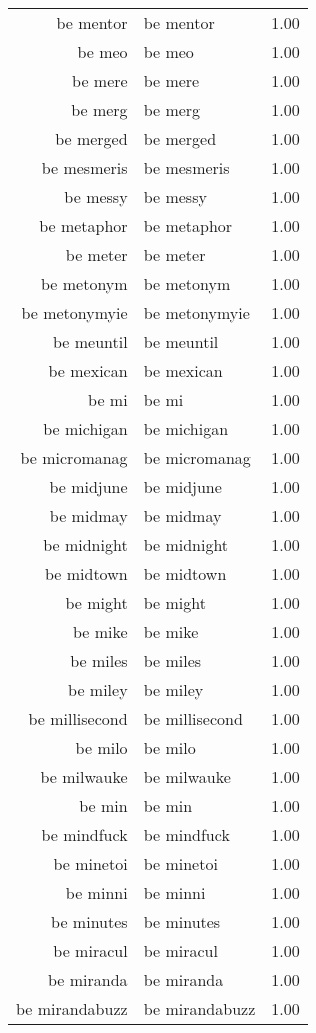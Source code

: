 \begin{table}[ht]
\begin{tabular}{rlr}
  be mentor & be mentor & 1.00 \\ 
  be meo & be meo & 1.00 \\ 
  be mere & be mere & 1.00 \\ 
  be merg & be merg & 1.00 \\ 
  be merged & be merged & 1.00 \\ 
  be mesmeris & be mesmeris & 1.00 \\ 
  be messy & be messy & 1.00 \\ 
  be metaphor & be metaphor & 1.00 \\ 
  be meter & be meter & 1.00 \\ 
  be metonym & be metonym & 1.00 \\ 
  be metonymyie & be metonymyie & 1.00 \\ 
  be meuntil & be meuntil & 1.00 \\ 
  be mexican & be mexican & 1.00 \\ 
  be mi & be mi & 1.00 \\ 
  be michigan & be michigan & 1.00 \\ 
  be micromanag & be micromanag & 1.00 \\ 
  be midjune & be midjune & 1.00 \\ 
  be midmay & be midmay & 1.00 \\ 
  be midnight & be midnight & 1.00 \\ 
  be midtown & be midtown & 1.00 \\ 
  be might & be might & 1.00 \\ 
  be mike & be mike & 1.00 \\ 
  be miles & be miles & 1.00 \\ 
  be miley & be miley & 1.00 \\ 
  be millisecond & be millisecond & 1.00 \\ 
  be milo & be milo & 1.00 \\ 
  be milwauke & be milwauke & 1.00 \\ 
  be min & be min & 1.00 \\ 
  be mindfuck & be mindfuck & 1.00 \\ 
  be minetoi & be minetoi & 1.00 \\ 
  be minni & be minni & 1.00 \\ 
  be minutes & be minutes & 1.00 \\ 
  be miracul & be miracul & 1.00 \\ 
  be miranda & be miranda & 1.00 \\ 
  be mirandabuzz & be mirandabuzz & 1.00 \\ 

\end{tabular}
\end{table}
